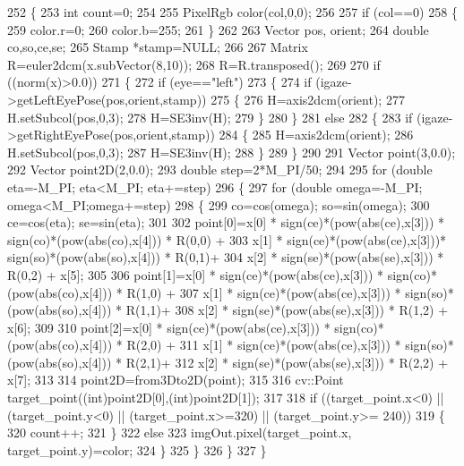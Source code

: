 \begin{DoxyCode}
252 \{
253     \textcolor{keywordtype}{int} count=0;
254 
255     PixelRgb color(col,0,0);
256 
257     \textcolor{keywordflow}{if} (col==0)
258     \{
259         color.r=0;
260         color.b=255;
261     \}
262 
263     Vector pos, orient;
264     \textcolor{keywordtype}{double} co,so,ce,se;
265     Stamp *stamp=NULL;
266 
267     Matrix R=euler2dcm(x.subVector(8,10));
268     R=R.transposed();
269 
270     \textcolor{keywordflow}{if} ((norm(x)>0.0))
271     \{
272         \textcolor{keywordflow}{if} (eye==\textcolor{stringliteral}{"left"})
273         \{
274             \textcolor{keywordflow}{if} (igaze->getLeftEyePose(pos,orient,stamp))
275             \{
276                 H=axis2dcm(orient);
277                 H.setSubcol(pos,0,3);
278                 H=SE3inv(H);
279             \}
280         \}
281         \textcolor{keywordflow}{else}
282         \{
283             \textcolor{keywordflow}{if} (igaze->getRightEyePose(pos,orient,stamp))
284             \{
285                 H=axis2dcm(orient);
286                 H.setSubcol(pos,0,3);
287                 H=SE3inv(H);
288             \}
289         \}
290 
291         Vector point(3,0.0);
292         Vector point2D(2,0.0);
293         \textcolor{keywordtype}{double} step=2*M\_PI/50;
294 
295         \textcolor{keywordflow}{for} (\textcolor{keywordtype}{double} eta=-M\_PI; eta<M\_PI; eta+=step)
296         \{
297              \textcolor{keywordflow}{for} (\textcolor{keywordtype}{double} omega=-M\_PI; omega<M\_PI;omega+=step)
298              \{
299                  co=cos(omega); so=sin(omega);
300                  ce=cos(eta); se=sin(eta);
301 
302                  point[0]=x[0] * sign(ce)*(pow(abs(ce),x[3])) * sign(co)*(pow(abs(co),x[4])) * R(0,0) +
303                             x[1] * sign(ce)*(pow(abs(ce),x[3]))* sign(so)*(pow(abs(so),x[4])) * R(0,1)+
304                                 x[2] * sign(se)*(pow(abs(se),x[3])) * R(0,2) + x[5];
305 
306                  point[1]=x[0] * sign(ce)*(pow(abs(ce),x[3])) * sign(co)*(pow(abs(co),x[4])) * R(1,0) +
307                             x[1] * sign(ce)*(pow(abs(ce),x[3])) * sign(so)*(pow(abs(so),x[4])) * R(1,1)+
308                                 x[2] * sign(se)*(pow(abs(se),x[3])) * R(1,2) + x[6];
309 
310                  point[2]=x[0] * sign(ce)*(pow(abs(ce),x[3])) * sign(co)*(pow(abs(co),x[4])) * R(2,0) +
311                             x[1] * sign(ce)*(pow(abs(ce),x[3])) * sign(so)*(pow(abs(so),x[4])) * R(2,1)+
312                                 x[2] * sign(se)*(pow(abs(se),x[3])) * R(2,2) + x[7];
313 
314                  point2D=from3Dto2D(point);
315 
316                  cv::Point target\_point((\textcolor{keywordtype}{int})point2D[0],(\textcolor{keywordtype}{int})point2D[1]);
317 
318                  \textcolor{keywordflow}{if} ((target\_point.x<0) || (target\_point.y<0) || (target\_point.x>=320) || (target\_point.y>=
      240))
319                  \{
320                      count++;
321                  \}
322                  \textcolor{keywordflow}{else}
323                     imgOut.pixel(target\_point.x, target\_point.y)=color;
324              \}
325          \}
326     \}
327 \}
\end{DoxyCode}
